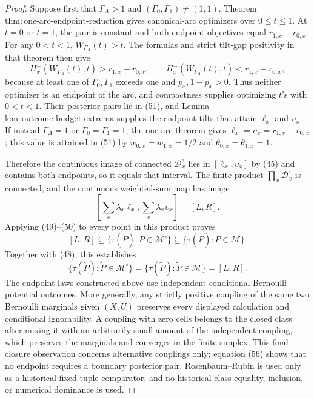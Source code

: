 \documentclass{article}
\begin{document}
\begin{proof}
Suppose first that \(\Gamma_A>1\) and \((\Gamma_0,\Gamma_1)\neq(1,1)\).  Theorem \(\mathrm{thm{:}one\text{-}arc\text{-}endpoint\text{-}reduction}\) gives canonical-arc optimizers over \(0\leq t\leq1\).  At \(t=0\) or \(t=1\), the pair is constant and both endpoint objectives equal \(r_{1,x}-r_{0,x}\).  For any \(0<t<1\), \(W_{\Gamma_A}(t)>t\).  The formulas and strict tilt-gap positivity in that theorem then give
\[
 H_x^+(W_{\Gamma_A}(t),t)>r_{1,x}-r_{0,x},
 \qquad
 H_x^-(W_{\Gamma_A}(t),t)<r_{1,x}-r_{0,x},                             \tag{53}
\]
because at least one of \(\Gamma_0,\Gamma_1\) exceeds one and \(p_x,1-p_x>0\).  Thus neither optimizer is an endpoint of the arc, and compactness supplies optimizing \(t\)'s with \(0<t<1\).  Their posterior pairs lie in (51), and Lemma \(\mathrm{lem{:}outcome\text{-}budget\text{-}extrema}\) supplies the endpoint tilts that attain \(\ell_x\) and \(\upsilon_x\).  If instead \(\Gamma_A=1\) or \(\Gamma_0=\Gamma_1=1\), the one-arc theorem gives \(\ell_x=\upsilon_x=r_{1,x}-r_{0,x}\); this value is attained in (51) by \(w_{0,x}=w_{1,x}=1/2\) and \(\theta_{0,x}=\theta_{1,x}=1\).

Therefore the continuous image of connected \(\mathcal D_x^{\circ}\) lies in \([\ell_x,\upsilon_x]\) by (45) and contains both endpoints, so it equals that interval.  The finite product \(\prod_x\mathcal D_x^{\circ}\) is connected, and the continuous weighted-sum map has image
\[
 \left[\sum_x\lambda_x\ell_x,
       \sum_x\lambda_x\upsilon_x\right]=[L,R].                       \tag{54}
\]
Applying (49)--(50) to every point in this product proves
\[
 [L,R]
 \subseteq\{\tau(\widetilde P):\widetilde P\in\mathcal M^{\circ}\}
 \subseteq\{\tau(\widetilde P):\widetilde P\in\mathcal M\}.
                                                                            \tag{55}
\]
Together with (48), this establishes
\[
 \{\tau(\widetilde P):\widetilde P\in\mathcal M^{\circ}\}
 =\{\tau(\widetilde P):\widetilde P\in\mathcal M\}
 =[L,R].                                                                 \tag{56}
\]
The endpoint laws constructed above use independent conditional Bernoulli potential outcomes.  More generally, any strictly positive coupling of the same two Bernoulli marginals given \((X,U)\) preserves every displayed calculation and conditional ignorability.  A coupling with zero cells belongs to the closed class after mixing it with an arbitrarily small amount of the independent coupling, which preserves the marginals and converges in the finite simplex.  This final closure observation concerns alternative couplings only; equation (56) shows that no endpoint requires a boundary posterior pair.  Rosenbaum--Rubin is used only as a historical fixed-tuple comparator, and no historical class equality, inclusion, or numerical dominance is used.
\end{proof}
\end{document}
